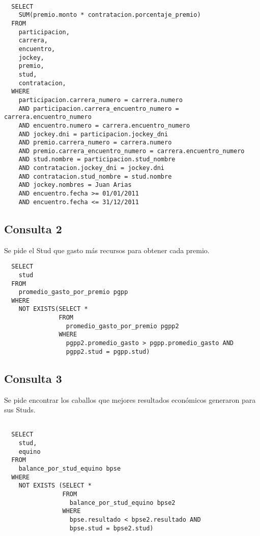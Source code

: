 \documentclass[a4paper,11pt]{article}
\begin{document}
\begin{lstlisting}

  SELECT 
    SUM(premio.monto * contratacion.porcentaje_premio)
  FROM
    participacion,
    carrera,
    encuentro,
    jockey,
    premio,
    stud,
    contratacion,
  WHERE
    participacion.carrera_numero = carrera.numero
    AND participacion.carrera_encuentro_numero = carrera.encuentro_numero
    AND encuentro.numero = carrera.encuentro_numero
    AND jockey.dni = participacion.jockey_dni
    AND premio.carrera_numero = carrera.numero
    AND premio.carrera_encuentro_numero = carrera.encuentro_numero
    AND stud.nombre = participacion.stud_nombre
    AND contratacion.jockey_dni = jockey.dni
    AND contratacion.stud_nombre = stud.nombre
    AND jockey.nombres = Juan Arias
    AND encuentro.fecha >= 01/01/2011
    AND encuentro.fecha <= 31/12/2011

\end{lstlisting}

\subsection{Consulta 2}

Se pide el Stud que gasto más recursos para obtener cada premio.

\begin{lstlisting}
  SELECT 
    stud 
  FROM
    promedio_gasto_por_premio pgpp
  WHERE 
    NOT EXISTS(SELECT * 
               FROM 
                 promedio_gasto_por_premio pgpp2
               WHERE 
                 pgpp2.promedio_gasto > pgpp.promedio_gasto AND 
                 pgpp2.stud = pgpp.stud)
\end{lstlisting}

\subsection{Consulta 3}

Se pide encontrar los caballos que mejores resultados económicos generaron para
sus Studs.

\begin{lstlisting}
 
  SELECT 
    stud, 
    equino 
  FROM
    balance_por_stud_equino bpse
  WHERE
    NOT EXISTS (SELECT * 
                FROM 
                  balance_por_stud_equino bpse2
                WHERE 
                  bpse.resultado < bpse2.resultado AND 
                  bpse.stud = bpse2.stud)

\end{lstlisting}
\end{document}
